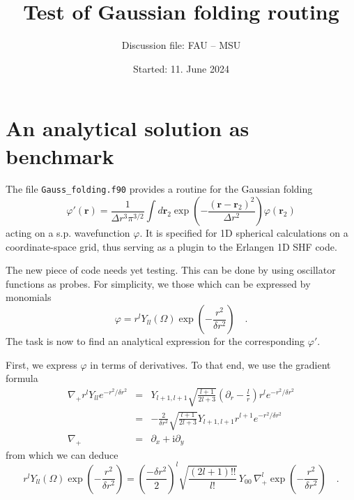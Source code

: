 \documentclass[12pt]{article}
\begin{document}
\title{Test of Gaussian folding routing}
\author{Discussion file: FAU -- MSU}
\date{Started: 11. June 2024}
\maketitle

\section{An analytical solution as benchmark}

The file \texttt{Gauss\_folding.f90} provides a routine for the
Gaussian folding
\begin{equation}
  \varphi'(\mathbf{r})
  =
  \frac{1}{\Delta r^3\pi^{3/2}}\int d\mathbf{r}_2
  \exp\left(-\frac{(\mathbf{r}-\mathbf{r}_2)^2}{\Delta r^2}\right)
  \varphi(\mathbf{r}_2)
\end{equation}
acting on a s.p. wavefunction $\varphi$. It is specified for 1D
spherical calculations on a coordinate-space grid, thus serving as a
plugin to the Erlangen 1D SHF code.

The new piece of code needs yet testing. This can be done by using
oscillator functions as probes. For simplicity, we those which can be
expressed by monomials
\begin{equation}
  \varphi
  =
  r^lY_{ll}(\Omega)\exp\left(-\frac{r^2}{\delta r^2}\right)
  \quad.
\label{eq:initHO}
\end{equation}
The task is now to find an analytical expression for the corresponding
$\varphi'$. 

First, we express $\varphi$ in terms of derivatives. To that end, we
use the gradient formula 
\begin{eqnarray}
  \nabla_+r^lY_{ll}e^{-r^2/\delta r^2}
  &=&
  Y_{l+1,l+1}\sqrt{\frac{l+1}{2l+3}}\left(\partial_r-\frac{l}{r}\right)
  r^le^{-r^2/\delta r^2}
\nonumber\\
  &=&
  -\frac{2}{\delta r^2}\sqrt{\frac{l+1}{2l+3}}Y_{l+1,l+1}
  r^{l+1}e^{-r^2/\delta r^2}
\\
  \nabla_+
  &=&
  \partial_x+\mathrm{i}\partial_y  
\end{eqnarray}
from which we can deduce
\begin{equation}
  r^lY_{ll}(\Omega)\exp\left(-\frac{r^2}{\delta r^2}\right)
  =
  \left(\frac{-\delta r^2}{2}\right)^l
  \sqrt{\frac{(2l+1)!!}{l!}}\,Y_{00}\,
  \nabla_+^l\exp\left(-\frac{r^2}{\delta r^2}\right)
  \quad.
\label{eq:rpowerlfunction}
\end{equation}
\end{document}
